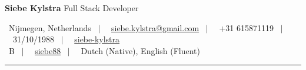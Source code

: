 \begin{center}
{\Large \textbf{Siebe Kylstra} Full Stack Developer}

\vspace{0.3cm}

{\small \faMapMarker \ Nijmegen, Netherlands \ $|$ \ \faEnvelope \ \href{mailto:siebe.kylstra@gmail.com}{siebe.kylstra@gmail.com} \ $|$ \ \faPhone \ +31 615871119 \ $|$ \ \faCalendar \ 31/10/1988 \ $|$ \ \faLinkedin \ \href{https://linkedin.com/in/siebe-kylstra}{siebe-kylstra} \\ \faCar \ B \ $|$ \ \faGithub \ \href{https://github.com/siebe88}{siebe88} \ $|$ \ \faGlobe \ Dutch (Native), English (Fluent)}

\end{center}
\rule{\textwidth}{0.5pt}